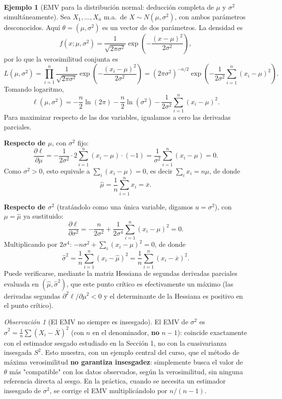 \documentclass[11pt,a4paper]{article}
\theoremstyle{plain}
\theoremstyle{definition}
\newtheorem{ejemplo}[teorema]{Ejemplo}
\theoremstyle{remark}
\newtheorem{observacion}[teorema]{Observación}
\begin{document}
\begin{ejemplo}[EMV para la distribución normal: deducción completa de $\mu$ y $\sigma^2$ simultáneamente]
Sea $X_1,\dots,X_n$ m.a.\ de $X\sim N(\mu,\sigma^2)$, con ambos parámetros desconocidos. Aquí $\theta=(\mu,\sigma^2)$ es un vector de dos parámetros. La densidad es
\[
f(x;\mu,\sigma^2) = \frac{1}{\sqrt{2\pi\sigma^2}}\exp\left(-\frac{(x-\mu)^2}{2\sigma^2}\right),
\]
por lo que la verosimilitud conjunta es
\[
L(\mu,\sigma^2) = \prod_{i=1}^n \frac{1}{\sqrt{2\pi\sigma^2}}\exp\left(-\frac{(x_i-\mu)^2}{2\sigma^2}\right) = (2\pi\sigma^2)^{-n/2}\exp\left(-\frac{1}{2\sigma^2}\sum_{i=1}^n (x_i-\mu)^2\right).
\]
Tomando logaritmo,
\[
\ell(\mu,\sigma^2) = -\frac{n}{2}\ln(2\pi) - \frac{n}{2}\ln(\sigma^2) - \frac{1}{2\sigma^2}\sum_{i=1}^n (x_i-\mu)^2.
\]
Para maximizar respecto de las dos variables, igualamos a cero las derivadas parciales.

\textbf{Respecto de $\mu$}, con $\sigma^2$ fijo:
\[
\frac{\partial \ell}{\partial\mu} = -\frac{1}{2\sigma^2}\cdot 2\sum_{i=1}^n (x_i-\mu)\cdot(-1) = \frac{1}{\sigma^2}\sum_{i=1}^n (x_i-\mu) = 0.
\]
Como $\sigma^2>0$, esto equivale a $\sum_i (x_i-\mu)=0$, es decir $\sum_i x_i = n\mu$, de donde
\[
\widehat\mu = \frac1n\sum_{i=1}^n x_i = \overline x.
\]

\textbf{Respecto de $\sigma^2$} (tratándolo como una única variable, digamos $u=\sigma^2$), con $\mu=\widehat\mu$ ya sustituido:
\[
\frac{\partial\ell}{\partial \sigma^2} = -\frac{n}{2\sigma^2} + \frac{1}{2\sigma^4}\sum_{i=1}^n (x_i-\mu)^2 = 0.
\]
Multiplicando por $2\sigma^4$: $-n\sigma^2+\sum_i(x_i-\mu)^2=0$, de donde
\[
\widehat\sigma^2 = \frac1n\sum_{i=1}^n (x_i-\widehat\mu)^2 = \frac1n\sum_{i=1}^n (x_i-\overline x)^2.
\]
Puede verificarse, mediante la matriz Hessiana de segundas derivadas parciales evaluada en $(\widehat\mu,\widehat\sigma^2)$, que este punto crítico es efectivamente un máximo (las derivadas segundas $\partial^2\ell/\partial\mu^2<0$ y el determinante de la Hessiana es positivo en el punto crítico).
\end{ejemplo}

\begin{observacion}[El EMV no siempre es insesgado]
El EMV de $\sigma^2$ es $\widehat\sigma^2=\frac1n\sum(X_i-\overline X)^2$ (con $n$ en el denominador, \textbf{no} $n-1$): coincide exactamente con el estimador sesgado estudiado en la Sección 1, no con la cuasivarianza insesgada $S^2$. Esto muestra, con un ejemplo central del curso, que el método de máxima verosimilitud \textbf{no garantiza insesgadez}: simplemente busca el valor de $\theta$ más "compatible" con los datos observados, según la verosimilitud, sin ninguna referencia directa al sesgo. En la práctica, cuando se necesita un estimador insesgado de $\sigma^2$, se corrige el EMV multiplicándolo por $n/(n-1)$.
\end{observacion}
\end{document}
